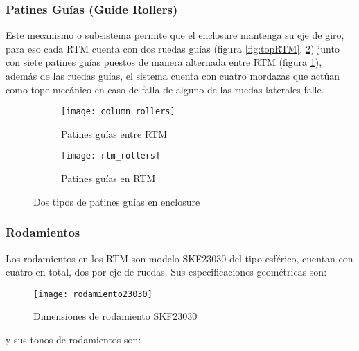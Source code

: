                 \subsubsection{Patines Guías (Guide Rollers)}
                    Este mecanismo o subsistema permite que el enclosure mantenga su eje de giro, para eso cada RTM cuenta con dos ruedas guías (figura \ref{fig:topRTM},  \ref{fig:rtm_rollers}) junto con siete patines guías puestos de manera alternada entre RTM (figura \ref{fig:column_rollers}), además de las ruedas guías, el sistema cuenta con cuatro mordazas que actúan como tope mecánico en caso de falla de alguno de las ruedas laterales falle.
                    \begin{figure}[H]
        				\centering
        				\begin{subfigure}[b]{0.45\textwidth}
        					\texttt{[image: column\_rollers]}
        					\caption{Patines guías entre RTM}
        					\label{fig:column_rollers}
        				\end{subfigure}			    
        			    \begin{subfigure}[b]{0.45\textwidth}
        			    	\texttt{[image: rtm\_rollers]}
        			    	\caption{Patines guías en RTM}
        			    	\label{fig:rtm_rollers}
        			    \end{subfigure}
        		        \caption{Dos tipos de patines guías en enclosure}
        		        \label{fig:rollers}
                    \end{figure}
                \subsubsection{Rodamientos}
                    Los rodamientos en los RTM son modelo SKF23030 del tipo esférico, cuentan con cuatro en total, dos por eje de ruedas. Sus especificaciones geométricas son:
                    \begin{figure}[H]
                        \centering
                        \texttt{[image: rodamiento23030]}
                        \caption{Dimensiones de rodamiento SKF23030}
                        \label{fig:rodamientoskf23030}
                    \end{figure}
                    
                    y sus tonos de rodamientos son:
                    
